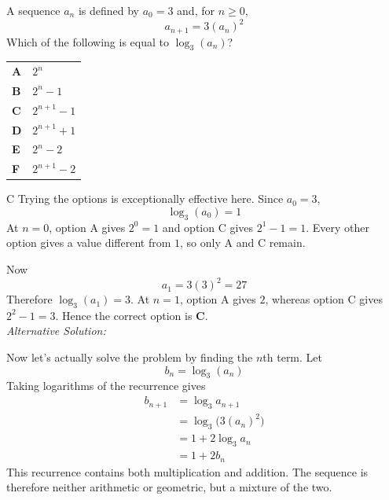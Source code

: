 \documentclass[11pt,a4paper]{article}
\begin{document}
\clearpage
\thispagestyle{djssolutions}
\vspace*{8pt}
\begin{enumerate}[label=\textbf{\arabic*.},leftmargin=*,itemsep=0pt,start=10]
A sequence $a_n$ is defined by $a_0=3$ and, for $n\ge 0$, \[ a_{n+1}=3(a_n)^2 \] Which of the following is equal to $\log_3(a_n)$?

\par\vspace*{12pt}
\begin{tabularx}{\linewidth}{@{}>{\bfseries}l Y@{}}
A &
$2^n$
\\[0.8em]
B &
$2^n-1$
\\[0.8em]
C &
$2^{n+1}-1$
\\[0.8em]
D &
$2^{n+1}+1$
\\[0.8em]
E &
$2^{n}-2$
\\[0.8em]
F &
$2^{n+1}-2$
\\
\end{tabularx}

\begin{djsSolution}{C}
Trying the options is exceptionally effective here. Since $a_0=3$,
\[
\log_3(a_0)=1
\]
At $n=0$, option A gives $2^0=1$ and option C gives $2^1-1=1$. Every other option gives a value different from $1$, so only A and C remain.

Now
\[
a_1=3(3)^2=27
\]
Therefore $\log_3(a_1)=3$. At $n=1$, option A gives $2$, whereas option C gives $2^2-1=3$. Hence the correct option is \textbf{C}.\\[5pt]

\textit{Alternative Solution:} 

Now let's actually solve the problem by finding the $n$th term. Let
\[
b_n=\log_3(a_n)
\]
Taking logarithms of the recurrence gives
\begin{align*}
    b_{n+1}&=\log_3a_{n+1}\\[5pt]
           &=\log_3\bigl(3(a_n)^2\bigr)\\[5pt]
           &= 1 + 2\log_3a_n \\[5pt]
           &=1+2b_n
\end{align*}
This recurrence contains both multiplication and addition. The sequence is therefore neither arithmetic or geometric, but a mixture of the two.


\end{djsSolution}
\end{enumerate}
\end{document}
